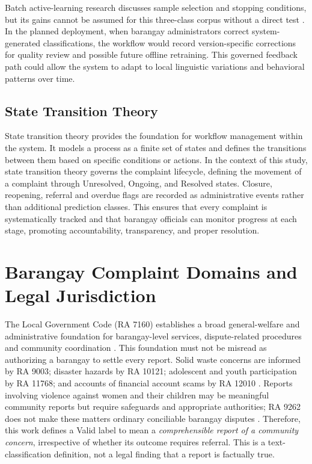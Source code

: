 Batch active-learning research discusses sample selection and stopping conditions, but its gains cannot be assumed for this three-class corpus without a direct test \cite{beatty2018,ghose2024}. In the planned deployment, when barangay administrators correct system-generated classifications, the workflow would record version-specific corrections for quality review and possible future offline retraining. This governed feedback path could allow the system to adapt to local linguistic variations and behavioral patterns over time.



\subsection{State Transition Theory}
State transition theory provides the foundation for workflow management within the system. It models a process as a finite set of states and defines the transitions between them based on specific conditions or actions. In the context of this study, state transition theory governs the complaint lifecycle, defining the movement of a complaint through Unresolved, Ongoing, and Resolved states. Closure, reopening, referral and overdue flags are recorded as administrative events rather than additional prediction classes. This ensures that every complaint is systematically tracked and that barangay officials can monitor progress at each stage, promoting accountability, transparency, and proper resolution.


\section{Barangay Complaint Domains and Legal Jurisdiction}
The Local Government Code (RA 7160) establishes a broad general-welfare and administrative foundation for barangay-level services, dispute-related procedures and community coordination \cite{ra7160}. This foundation must not be misread as authorizing a barangay to settle every report. Solid waste concerns are informed by RA 9003; disaster hazards by RA 10121; adolescent and youth participation by RA 11768; and accounts of financial account scams by RA 12010 \cite{ra9003,ra10121,ra11768,ra12010}. Reports involving violence against women and their children may be meaningful community reports but require safeguards and appropriate authorities; RA 9262 does not make these matters ordinary conciliable barangay disputes \cite{ra9262}. Therefore, this work defines a Valid label to mean a \emph{comprehensible report of a community concern}, irrespective of whether its outcome requires referral. This is a text-classification definition, not a legal finding that a report is factually true.

